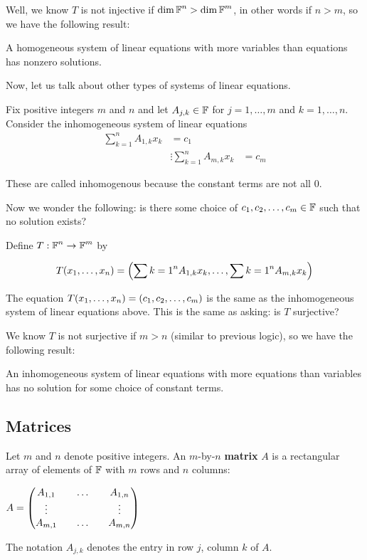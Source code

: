 Well, we know $T$ is not injective if $\dim \operatorname{\mathbb{F}}^n > \dim \operatorname{\mathbb{F}}^m$, in other words
if $n > m$, so we have the following result:

\begin{theorem} 
   A homogeneous system of linear equations with more
   variables than equations has nonzero solutions.
\end{theorem}

Now, let us talk about other types of systems of linear equations.

\begin{definition} 
   Fix positive integers $m$ and $n$ and let $A_{j, k} \in \operatorname{\mathbb{F}}$ for
   $j = 1, \dots, m$ and $k = 1, \dots, n$. Consider
   the inhomogeneous system of linear equations
   \begin{align*}
      \sum_{k=1}^n A_{1,k}x_k &= c_1 \\
      &\vdots
      \sum_{k=1}^n A_{m,k}x_k &= c_m
   \end{align*}

   These are called inhomogenous because the constant terms are
   not all 0.
\end{definition}

Now we wonder the following:
is there some choice of $c_1, c_2, \ldots, c_{m} \in \operatorname{\mathbb{F}}$ such that
no solution exists?

Define $T: \operatorname{\mathbb{F}}^n \to \operatorname{\mathbb{F}}^m$ by

\[ T(x_1, \dots, x_n) = \qty(\sum{k=1}^n A_{1,k}x_k, \dots, \sum{k=1}^n A_{m, k}x_k) \]

The equation $T(x_1, \dots, x_n) = (c_1, c_2, \ldots, c_{m})$ is the same
as the inhomogeneous system of linear equations above. This is the same
as asking: is $T$ surjective?

We know $T$ is not surjective if $m > n$ (similar to previous logic),
so we have the following result:

\begin{theorem} 
   An inhomogeneous system of linear equations with more equations
   than variables has no solution for some choice of
   constant terms.
\end{theorem}

\subsection{Matrices}

\begin{definition} [Matrix]
   Let $m$ and $n$ denote positive integers. An $m$-by-$n$ \textbf{matrix}
   $A$ is a rectangular array of elements of $\operatorname{\mathbb{F}}$ with $m$ rows and $n$ columns:

   $A = \begin{pmatrix}
     A_{1,1} && \dots && A_{1,n} \\
     \vdots && \empty && \vdots \\
     A_{m,1} && \dots && A_{m,n} 
   \end{pmatrix}$

   The notation $A_{j,k}$ denotes the entry in row $j$, column $k$ of $A$.
\end{definition}

